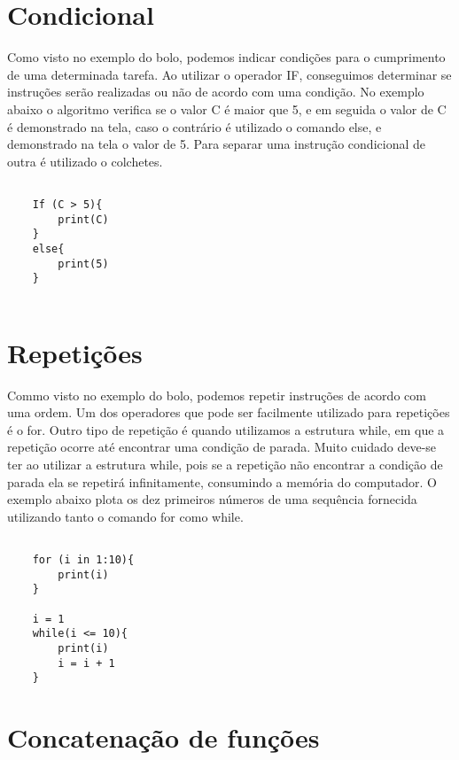\section{Condicional} 

Como visto no exemplo do bolo, podemos indicar condições para o cumprimento de uma determinada tarefa. Ao utilizar o operador IF, conseguimos determinar se instruções serão realizadas ou não de acordo com uma condição. No exemplo abaixo o algoritmo verifica se o valor C é maior que 5, e em seguida o valor de C é demonstrado na tela, caso o contrário é utilizado o comando else, e demonstrado na tela o valor de 5. Para separar uma instrução condicional de outra é utilizado o colchetes.

\begin{scriptsize}
	\estiloR
	\begin{lstlisting}[]
	
	If (C > 5){
		print(C)
	}
	else{
		print(5)
	}
	
	\end{lstlisting}
\end{scriptsize}

\section{Repetições}

Commo visto no exemplo do bolo, podemos repetir instruções de acordo com uma ordem. Um dos operadores que pode ser facilmente utilizado para repetições é o for. Outro tipo de repetição é quando utilizamos a estrutura while, em que a repetição ocorre até encontrar uma condição de parada. Muito cuidado deve-se ter ao utilizar a estrutura while, pois se a repetição não encontrar a condição de parada ela se repetirá infinitamente, consumindo a memória do computador. O exemplo abaixo plota os dez primeiros números de uma sequência fornecida utilizando tanto o comando for como while. 

\begin{scriptsize}
	\estiloR
	\begin{lstlisting}[]

	for (i in 1:10){
		print(i)
	}
	
	i = 1
	while(i <= 10){
		print(i)
		i = i + 1
	}
	\end{lstlisting}
\end{scriptsize}

\section{Concatenação de funções} 

